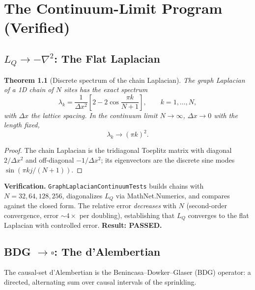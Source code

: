 \documentclass[11pt,twoside]{book}
\newtheorem{theorem}{Theorem}[chapter]
\begin{document}
\part{The Continuum-Limit Program (Verified)}

\chapter{$L_Q \to -\nabla^2$: The Flat Laplacian}
\label{ch:flat-laplacian}

\begin{theorem}[Discrete spectrum of the chain Laplacian]
The graph Laplacian of a 1D chain of $N$ sites has the exact spectrum
\begin{equation}
\lambda_k = \frac{1}{\Delta x^2}\left[2 - 2\cos\frac{\pi k}{N+1}\right],
\qquad k=1,\dots,N,
\end{equation}
with $\Delta x$ the lattice spacing. In the continuum limit $N\to\infty$, $\Delta x\to0$
with the length fixed,
\begin{equation}
\lambda_k \to (\pi k)^2 .
\end{equation}
\end{theorem}

\begin{proof}
The chain Laplacian is the tridiagonal Toeplitz matrix with diagonal $2/\Delta x^2$ and
off-diagonal $-1/\Delta x^2$; its eigenvectors are the discrete sine modes
$\sin(\pi k j/(N+1))$.
\end{proof}

\textbf{Verification.} \texttt{GraphLaplacianContinuumTests} builds chains with
$N=32,64,128,256$, diagonalizes $L_Q$ via MathNet.Numerics, and compares against the closed
form. The relative error \emph{decreases} with $N$ (second-order convergence, error
$\sim4\times$ per doubling), establishing that $L_Q$ converges to the flat Laplacian with
controlled error. \textbf{Result: PASSED.}

\chapter{BDG $\to \square$: The d'Alembertian}
\label{ch:dalembertian}

The causal-set d'Alembertian is the Benincasa--Dowker--Glaser (BDG) operator: a
directed, alternating sum over causal intervals of the sprinkling.
\end{document}
